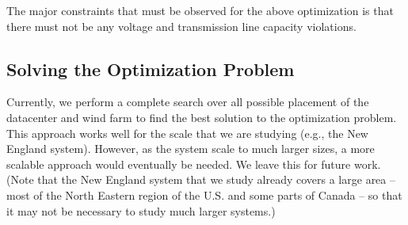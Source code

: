 The major constraints that must be observed for the above optimization is that there must not be any voltage and transmission line capacity violations.

\subsection{Solving the Optimization Problem}

Currently, we perform a complete search over all possible placement of the datacenter and wind farm to find the best solution to the optimization problem.  This approach works well for the scale that we are studying (e.g., the New England system).  However, as the system scale to much larger sizes, a more scalable approach would eventually be needed.  We leave this for future work.  (Note that the New England system that we study already covers a large area -- most of the North Eastern region of the U.S. and some parts of Canada -- so that it may not be necessary to study much larger systems.)





